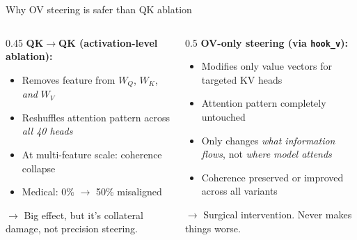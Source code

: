\documentclass[aspectratio=169]{beamer}
\begin{document}
\begin{frame}{Why OV steering is safer than QK ablation}
\begin{columns}
\begin{column}{0.45\textwidth}
\textbf{\textcolor{qkqk}{QK$\to$QK} (activation-level ablation):}
\begin{itemize}
    \item Removes feature from $W_Q$, $W_K$, \textit{and} $W_V$
    \item Reshuffles attention pattern across \textit{all 40 heads}
    \item At multi-feature scale: coherence collapse
    \item Medical: 0\% $\to$ 50\% misaligned
\end{itemize}

\vspace{0.5em}
$\to$ Big effect, but it's collateral damage, not precision steering.
\end{column}
\begin{column}{0.5\textwidth}
\textbf{\textcolor{qkov}{OV-only steering} (via \texttt{hook\_v}):}
\begin{itemize}
    \item Modifies only value vectors for targeted KV heads
    \item Attention pattern completely untouched
    \item Only changes \textit{what information flows}, not \textit{where model attends}
    \item Coherence preserved or improved across all variants
\end{itemize}

\vspace{0.5em}
$\to$ Surgical intervention. Never makes things worse.
\end{column}
\end{columns}
\end{frame}
\end{document}
